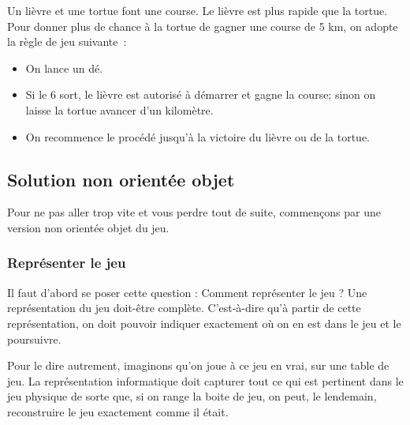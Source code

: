 		Un lièvre et une tortue font une course.
		Le lièvre est plus rapide que la tortue.
		Pour donner plus de chance à la tortue de gagner une course de 5 km, 
		on adopte la règle de jeu suivante~:
		\begin{itemize}
		\item 
			On lance un dé. 
		\item
			Si le 6 sort, 
			le lièvre est autorisé à démarrer et gagne la course; 
			sinon on laisse la tortue avancer d’un kilomètre.
		\item
			On recommence le procédé jusqu'à la victoire du lièvre ou de la tortue.
		\end{itemize}
		
	\subsection{Solution non orientée objet}
	
		Pour ne pas aller trop vite et vous perdre tout de suite,
		commençons par une version non orientée objet du jeu.
		
		\subsubsection*{Représenter le jeu}

			Il faut d'abord se poser cette question :
			Comment représenter le jeu ?
			Une représentation du jeu doit-être complète.
			C'est-à-dire qu'à partir de cette représentation,
			on doit pouvoir indiquer exactement où on en est dans le jeu
			et le poursuivre.
			
			Pour le dire autrement, 
			imaginons qu'on joue à ce jeu \og{}en vrai\fg{}, sur une table de jeu.
			La représentation informatique doit capturer tout ce qui est pertinent
			dans le jeu physique de sorte que, si on range la boite de jeu,
			on peut, le lendemain, reconstruire le jeu exactement comme il était.
			
